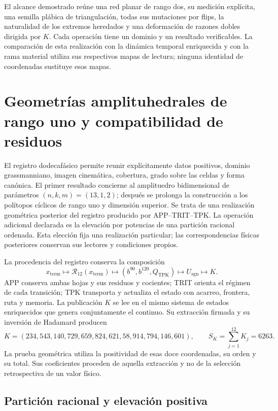 \documentclass[a4paper,10pt]{article}
\theoremstyle{definition}\newtheorem{definition}[theorem]{Definición}
\theoremstyle{remark}\newtheorem{remark}[theorem]{Observación}
\numberwithin{equation}{section}
\begin{document}
El alcance demostrado reúne una red planar de rango dos, su medición
explícita, una semilla plábica de triangulación, todas sus mutaciones por
flips, la naturalidad de los extremos heredados y una deformación de
razones dobles dirigida por \(K\). Cada operación tiene un dominio y un
resultado verificables. La comparación de esta realización con la
dinámica temporal enriquecida y con la rama material utiliza sus respectivos
mapas de lectura; ninguna identidad de coordenadas sustituye esos mapas.

\section{Geometrías amplituhedrales de rango uno y compatibilidad de residuos}
\label{sec:k-poligono-amplituhedral}

El registro dodecafásico permite reunir explícitamente datos positivos,
dominio grassmanniano, imagen cinemática, cobertura, grado sobre las celdas
y forma canónica. El primer resultado concierne al amplituedro
bidimensional de parámetros \((n,k,m)=(13,1,2)\); después se prolonga la
construcción a los polítopos cíclicos de rango uno y dimensión superior.
Se trata de una realización geométrica posterior del registro producido
por APP--TRIT--TPK. La operación adicional declarada es la elevación por
potencias de una partición racional ordenada. Esta elección fija una
realización particular; las correspondencias físicas posteriores conservan
sus lectores y condiciones propios.

La procedencia del registro conserva la composición
\[
 x_{\mathrm{term}}\longmapsto\mathcal R_{12}(x_{\mathrm{term}})
 \longmapsto(b^{90},b^{120},Q_{\mathrm{TPK}})
 \longmapsto U_{\mathrm{sgn}}\longmapsto K.
\]
APP conserva ambas hojas y sus residuos y cocientes; TRIT orienta el
régimen de cada transición; TPK transporta y actualiza el estado con
acarreo, frontera, ruta y memoria. La publicación \(K\) se lee en el mismo
sistema de estados enriquecidos que genera conjuntamente el continuo.
Su extracción firmada y su inversión
de Hadamard producen
\begin{equation}
 K=(234,543,140,729,659,824,621,58,914,794,146,601),
 \qquad S_K=\sum_{j=1}^{12}K_j=6263.
 \label{eq:polygon-K}
\end{equation}
La prueba geométrica utiliza la positividad de esas doce coordenadas, su
orden y su total. Sus coeficientes proceden de aquella extracción y no de
la selección retrospectiva de un valor físico.

\subsection{Partición racional y elevación positiva}
\end{document}
